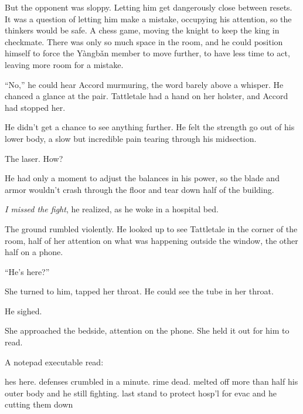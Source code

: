 But the opponent was sloppy.  Letting him get dangerously close between resets.  It was a question of letting him make a mistake, occupying his attention, so the thinkers would be safe.  A chess game, moving the knight to keep the king in checkmate.  There was only so much space in the room, and he could position himself to force the Y\`{a}ngb\v{a}n member to move further, to have less time to act, leaving more room for a mistake.



``No,'' he could hear Accord murmuring, the word barely above a whisper.  He chanced a glance at the pair.  Tattletale had a hand on her holster, and Accord had stopped her.



He didn't get a chance to see anything further.  He felt the strength go out of his lower body, a slow but incredible pain tearing through his midsection.



The laser.  How?



He had only a moment to adjust the balances in his power, so the blade and armor wouldn't crash through the floor and tear down half of the building.



\sectionbreak



\emph{I missed the fight}, he realized, as he woke in a hospital bed.



The ground rumbled violently.  He looked up to see Tattletale in the corner of the room, half of her attention on what was happening outside the window, the other half on a phone.



``He's here?''



She turned to him, tapped her throat.  He could see the tube in her throat.



He sighed.



She approached the bedside, attention on the phone.  She held it out for him to read.



A notepad executable read:



hes here.  defenses crumbled in a minute.  rime dead.  melted off more than half his outer body and he still fighting.  last stand to protect hosp'l for evac and he cutting them down



